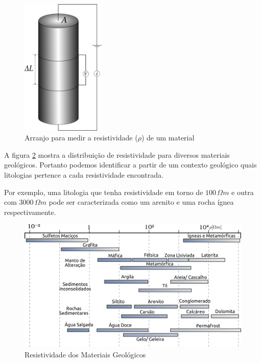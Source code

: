     
    \begin{figure}[h]
        \centering
        \caption{Arranjo para medir a resistividade ($\rho$) de um material}
        \centerline{\includegraphics[width=4cm]{texto/fig/resisti_telford.png}}
        \label{fig_resistividade}
    \end{figure}
    
    A figura \ref{tabela_resistividade} mostra a distribuição de resistividade para diversos materiais geológicos. 
    Portanto podemos identificar a partir de um contexto geológico quais litologias pertence a cada resistividade encontrada.
    
    Por exemplo, uma litologia que tenha resistividade em torno de  $100 \, \Omega m$ e outra com $3000 \, \Omega m $ pode ser caracterizada como um arenito e uma rocha ígnea respectivamente. 
    
    \begin{figure}[h]
        \centering
        \caption{Resistividade dos Materiais Geológicos}
        \centerline{\includegraphics[width=14cm]{texto/fig/resistividade_tabela.png}}
        \label{tabela_resistividade}
    \end{figure}
    
